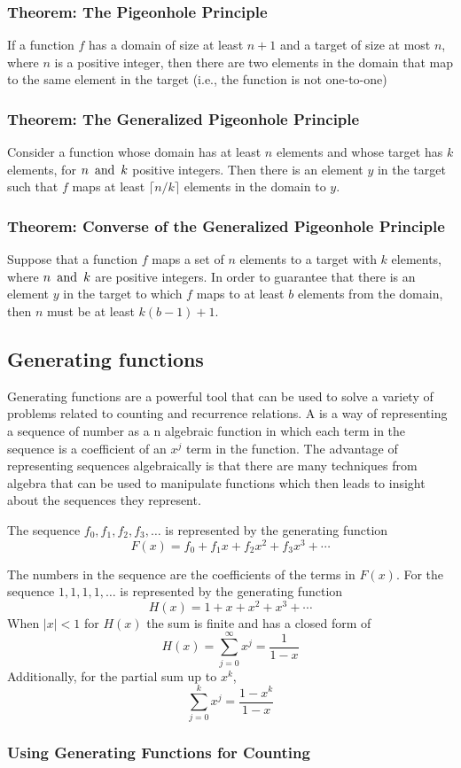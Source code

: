 \subsubsection*{Theorem: The Pigeonhole Principle}
If a function $f$ has a domain of size at least $n+1$ and a target of size at most $n$, where $n$ is a positive integer, then there are two elements in the domain that map to the same element in the target (i.e., the function is not one-to-one)

\subsubsection*{Theorem: The Generalized Pigeonhole Principle}
Consider a function whose domain has at least $n$ elements and whose target has $k$ elements, for $n \operatorname{~\text{and}~} k$ positive integers. Then there is an element $y$ in the target such that $f$ maps at least $\lceil n/k \rceil$ elements in the domain to $y$.

\subsubsection*{Theorem: Converse of the Generalized Pigeonhole Principle}
Suppose that a function $f$ maps a set of $n$ elements to a target with $k$ elements, where $n \operatorname{~\text{and}~} k$ are positive integers. In order to guarantee that there is an element $y$ in the target to which $f$ maps to at least $b$ elements from the domain, then $n$ must be at least $k(b-1)+1$.

\subsection{Generating functions}
Generating functions are a powerful tool that can be used to solve a variety of problems related to counting and recurrence relations. A  is a way of representing a sequence of number as a n algebraic function in which each term in the sequence is a coefficient of an $x^j$ term in the function. The advantage of representing sequences algebraically is that there are many techniques from algebra that can be used to manipulate functions which then leads to insight about the sequences they represent.

The sequence $f_0,f_1,f_2,f_3,\ldots$ is represented by the generating function
\[
  F(x) = f_0 + f_1x + f_2x^2 + f_3x^3 + \cdots
\]

The numbers in the sequence are the coefficients of the terms in $F(x)$. For the sequence $1,1,1,1,\ldots$ is represented by the generating function
\[
  H(x) = 1 + x + x^2 + x^3 + \cdots
\]
When $|x|<1$ for $H(x)$ the sum is finite and has a closed form of
\[
  H(x) = \sum_{j=0}^{\infty} x^j = \frac{1}{1-x}
\]
Additionally, for the partial sum up to $x^k$,
\[
  \sum_{j=0}^{k} x^j = \frac{1-x^k}{1-x}
\]

\subsubsection*{Using Generating Functions for Counting}